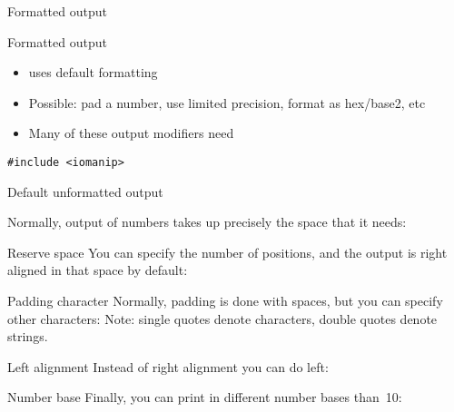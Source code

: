 
 {Formatted output}

\begin{block}{Formatted output}
  \label{sl:cformat}
  \begin{itemize}
  \item {} uses default formatting
  \item Possible: pad a number, use limited precision, format as hex/base2, etc
  \item 
    Many of these output modifiers need
  \end{itemize}
\begin{verbatim}
#include <iomanip>
\end{verbatim}
\end{block}

\begin{slide}{Default unformatted output}
  \label{sl:unformat}
\end{slide}

Normally, output of numbers takes up precisely the space that it needs:

\begin{block}{Reserve space}
  \label{sl:io-setw}
  You can specify the number of positions, and the output is right
  aligned in that space by default:
\end{block}

\begin{block}{Padding character}
  \label{sl:io-fill}
  Normally, padding is done with spaces, but you can specify other characters:
Note: single quotes denote characters, double quotes denote strings.
\end{block}

\begin{block}{Left alignment}
  \label{sl:io-left}
  Instead of right alignment you can do left:
\end{block}

\begin{block}{Number base}
  \label{sl:io-base}
  Finally, you can print in different number bases than~10:
\end{block}

